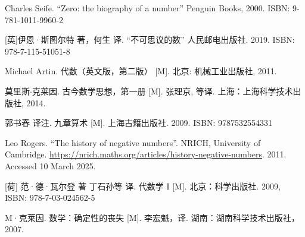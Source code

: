 Charles Seife. ``Zero: the biography of a number'' Penguin Books, 2000. ISBN: 9-781-1011-9960-2

[英]伊恩·斯图尔特 著，何生 译. ``不可思议的数'' 人民邮电出版社. 2019. ISBN: 978-7-115-51051-8

Michael Artin. 代数（英文版，第二版） [M]. 北京: 机械工业出版社, 2011. %

莫里斯$\cdot$克莱因. 古今数学思想，第一册 [M]. 张理京, 等译. 上海：上海科学技术出版社, 2014. %

郭书春 译注. 九章算术 [M]. 上海古籍出版社. 2009. ISBN: 9787532554331

Leo Rogers. ``The history of negative numbers''. NRICH, University of Cambridge. \url{https://nrich.maths.org/articles/history-negative-numbers}. 2011. Accessed 10 March 2025.

[荷] 范·德·瓦尔登 著 丁石孙等 译. 代数学 I [M]. 北京：科学出版社. 2009, ISBN: 978-7-03-024562-5

M·克莱因. 数学：确定性的丧失 [M]. 李宏魁，译. 湖南：湖南科学技术出版社，2007. %
